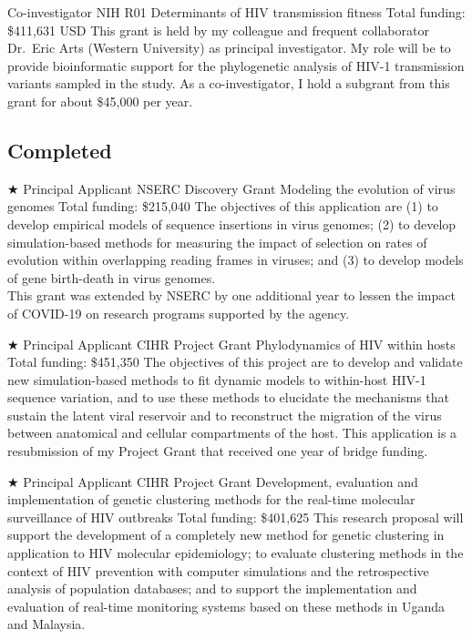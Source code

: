 {Co-investigator}
{NIH R01}  %
{Determinants of HIV transmission fitness}
{Total funding: \$411,631 USD}
{
This grant is held by my colleague and frequent collaborator Dr.~Eric Arts (Western University) as principal investigator.
My role will be to provide bioinformatic support for the phylogenetic analysis of HIV-1 transmission variants sampled in the study.
As a co-investigator, I hold a subgrant from this grant for about \$45,000 per year.
}





\vspace{1em}

\subsection {Completed}


{$\bigstar$ Principal Applicant}
{NSERC Discovery Grant}
{Modeling the evolution of virus genomes}
{Total funding: \$215,040} %
{
The objectives of this application are (1) to develop empirical models of sequence insertions in virus genomes; (2) to develop simulation-based methods for measuring the impact of selection on rates of evolution within overlapping reading frames in viruses; and (3) to develop models of gene birth-death in virus genomes.\\
This grant was extended by NSERC by one additional year to lessen the impact of COVID-19 on research programs supported by the agency.
}



{$\bigstar$ Principal Applicant}
{CIHR Project Grant} %
{Phylodynamics of HIV within hosts}
{Total funding: \$451,350}
{
The objectives of this project are to develop and validate new simulation-based methods to fit dynamic models to within-host HIV-1 sequence variation, and to use these methods to elucidate the mechanisms that sustain the latent viral reservoir and to reconstruct the migration of the virus between anatomical and cellular compartments of the host.
This application is a resubmission of my Project Grant that received one year of bridge funding.\\ 
}


{$\bigstar$ Principal Applicant}
{CIHR Project Grant} %
{Development, evaluation and implementation of genetic clustering methods for the real-time molecular surveillance of HIV outbreaks}
{Total funding: \$401,625}
{
This research proposal will support the development of a completely new method for genetic clustering in application to HIV molecular epidemiology; 
to evaluate clustering methods in the context of HIV prevention with computer simulations and the retrospective analysis of population databases; 
and to support the implementation and evaluation of real-time monitoring systems based on these methods in Uganda and Malaysia.\\
}



